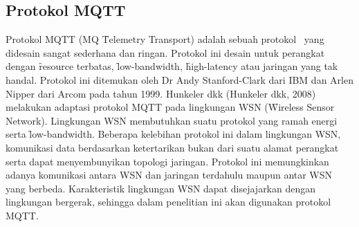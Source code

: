 


\subsection{Protokol MQTT}

Protokol MQTT (MQ \f{Telemetry Transport}) adalah sebuah protokol \pubsub~yang
didesain sangat sederhana dan ringan. Protokol ini desain untuk perangkat
dengan \f{resource} terbatas, \f{low-bandwidth}, \f{high-latency} atau jaringan
yang tak handal. Protokol ini ditemukan oleh Dr Andy Stanford-Clark dari IBM
dan Arlen Nipper dari Arcom pada tahun 1999. Hunkeler dkk (Hunkeler dkk, 2008)
melakukan adaptasi protokol MQTT pada lingkungan WSN (\f{Wireless Sensor
Network}). Lingkungan WSN membutuhkan suatu protokol yang ramah energi serta
\f{low-bandwidth}. Beberapa kelebihan protokol ini dalam lingkungan WSN,
komunikasi data berdasarkan ketertarikan bukan dari suatu alamat perangkat
serta dapat menyembunyikan topologi jaringan. Protokol ini memungkinkan adanya
komunikasi antara WSN dan jaringan terdahulu maupun antar WSN yang berbeda.
Karakteristik lingkungan WSN dapat disejajarkan dengan lingkungan bergerak,
sehingga dalam penelitian ini akan digunakan protokol MQTT.

